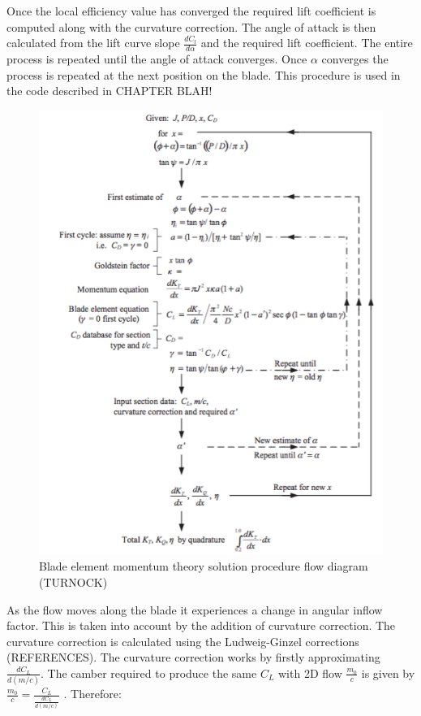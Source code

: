 \documentclass[]{report}
\begin{document}
Once the local efficiency value has converged the required lift coefficient is computed along with the curvature correction. The angle of attack is then calculated from the lift curve slope $\frac{dC_l}{d \alpha}$ and the required lift coefficient. The entire process is repeated until the angle of attack converges. Once $\alpha$ converges the process is repeated at the next position on the blade. This procedure is used in the code described in CHAPTER BLAH! 
 
 \begin{figure}[h]
	\centering
	\includegraphics[scale=0.5]{BEMT_flow_diagram}
	\caption{Blade element momentum theory solution procedure flow diagram (TURNOCK)}
	\label{fig:blade_element_flow_diagram}
 \end{figure}
 
As the flow moves along the blade it experiences a change in angular inflow factor. This is taken into account by the addition of curvature correction. The curvature correction is calculated using the Ludweig-Ginzel corrections (REFERENCES). The curvature correction works by firstly approximating $\frac{dC_L}{d(m/c)}$. The camber required to produce the same $C_L$ with 2D flow $\frac{m_0}{c}$ is given by $\frac{m_0}{c} = \frac{C_L}{\frac{dC_L}{d(m/c)}}$ . Therefore:
\end{document}
